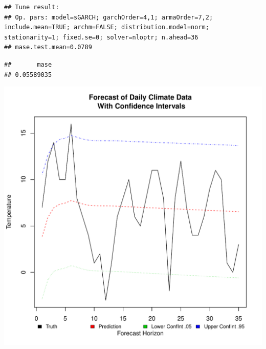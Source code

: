 \documentclass{article}\usepackage[]{graphicx}\usepackage[]{color}
\makeatletter
\def\maxwidth{ %
  \ifdim\Gin@nat@width>\linewidth
    \linewidth
  \else
    \Gin@nat@width
  \fi
}
\newenvironment{kframe}{%
 \def\at@end@of@kframe{}%
 \ifinner\ifhmode%
  \def\at@end@of@kframe{\end{minipage}}%
  \begin{minipage}{\columnwidth}%
 \fi\fi%
 \def\FrameCommand##1{\hskip\@totalleftmargin \hskip-\fboxsep
 \colorbox{shadecolor}{##1}\hskip-\fboxsep
     \hskip-\linewidth \hskip-\@totalleftmargin \hskip\columnwidth}%
 \MakeFramed {\advance\hsize-\width
   \@totalleftmargin\z@ \linewidth\hsize
   \@setminipage}}%
 {\par\unskip\endMakeFramed%
 \at@end@of@kframe}
\newenvironment{knitrout}{}{} %
\theoremstyle{definition}
\makeatother
\begin{document}
\begin{knitrout}
\color{fgcolor}\begin{kframe}
\begin{verbatim}
## Tune result:
## Op. pars: model=sGARCH; garchOrder=4,1; armaOrder=7,2; include.mean=TRUE; archm=FALSE; distribution.model=norm; stationarity=1; fixed.se=0; solver=nloptr; n.ahead=36
## mase.test.mean=0.0789
\end{verbatim}
\end{kframe}
\end{knitrout}

\begin{knitrout}
\color{fgcolor}\begin{kframe}
\begin{verbatim}
##       mase 
## 0.05589035
\end{verbatim}
\end{kframe}
\end{knitrout}

\begin{knitrout}
\color{fgcolor}
\includegraphics[width=\maxwidth]{figure/garchPlot-1} 

\end{knitrout}
\end{document}
